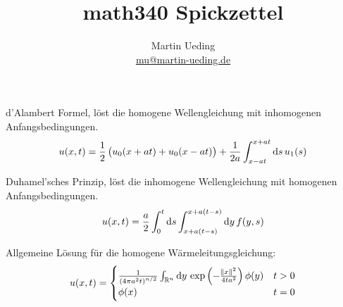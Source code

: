 


\title{math340 Spickzettel}
\author{
	Martin Ueding \\
	\small{\href{mailto:mu@martin-ueding.de}{mu@martin-ueding.de}}
}



\maketitle

d'Alambert Formel, löst die homogene Wellengleichung mit inhomogenen Anfangsbedingungen.
\[
	u(x, t) = \half \del{
		u_0(x + at)
		+ u_0(x - at)
	}
	+ \frac{1}{2a} \int_{x-at}^{x+at} \dif s \, u_1(s)
\]

Duhamel'sches Prinzip, löst die inhomogene Wellengleichung mit homogenen Anfangsbedingungen.
\[
	u(x, t) = \frac a2
	\int_0^t \dif s
	\int_{x+a(t-s)}^{x+a(t-s)} \dif y \, f(y, s)
\]

Allgemeine Lösung für die homogene Wärmeleitungsgleichung:
\[
	u(x, t) = \begin{cases}
		\frac{1}{\del{4 \pi a^2 t}^{n/2}} \int_{\R^n} \dif y \, \exp\del{- \frac{\norm x^2}{4 ta^2}} \phi(y) & t > 0 \\
		\phi(x) & t = 0
	\end{cases}
\]

%	
%	



